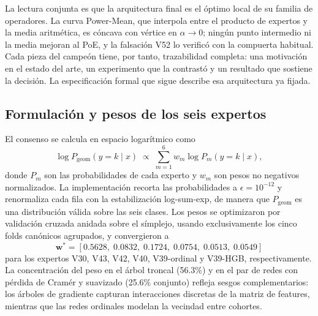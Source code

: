 \documentclass[journal]{IEEEtai}
\begin{document}
La lectura conjunta es que la arquitectura final es el \'optimo local de su familia de operadores.
La curva Power-Mean, que interpola entre el producto de expertos y la media aritm\'etica, es
c\'oncava con v\'ertice en $\alpha \to 0$; ning\'un punto intermedio ni la media mejoran al PoE, y
la falsaci\'on V52 lo verific\'o con la compuerta habitual. Cada pieza del campe\'on tiene, por
tanto, trazabilidad completa: una motivaci\'on en el estado del arte, un experimento que la
contrast\'o y un resultado que sostiene la decisi\'on. La especificaci\'on formal que sigue describe
esa arquitectura ya fijada.

\subsection{Formulaci\'on y pesos de los seis expertos}

El consenso se calcula en espacio logar\'itmico como
\begin{equation}
\log P_{\text{geom}}(y = k \mid x) \;\propto\; \sum_{m=1}^{6} w_m \log P_m(y = k \mid x),
\label{eq:poe}
\end{equation}
donde $P_m$ son las probabilidades de cada experto y $w_m$ son pesos no negativos normalizados. La implementaci\'on recorta las probabilidades a $\epsilon = 10^{-12}$ y renormaliza cada fila con la estabilizaci\'on log-sum-exp, de manera que $P_{\text{geom}}$ es una distribuci\'on v\'alida sobre las seis clases. Los pesos se optimizaron por validaci\'on cruzada anidada sobre el s\'implejo, usando exclusivamente los cinco folds can\'onicos agrupados, y convergieron a
\begin{equation}
\mathbf{w}^{\ast} = [0.5628,\; 0.0832,\; 0.1724,\; 0.0754,\; 0.0513,\; 0.0549]
\label{eq:pesos48}
\end{equation}
para los expertos V30, V43, V42, V40, V39-ordinal y V39-HGB, respectivamente. La concentraci\'on del peso en el \'arbol troncal (56.3\%) y en el par de redes con p\'erdida de Cram\'er y suavizado (25.6\% conjunto) refleja sesgos complementarios: los \'arboles de gradiente capturan interacciones discretas de la matriz de features, mientras que las redes ordinales modelan la vecindad entre cohortes.
\end{document}
